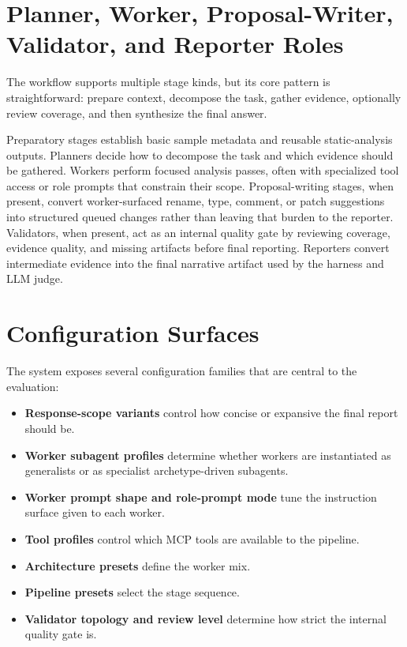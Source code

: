 \section{Planner, Worker, Proposal-Writer, Validator, and Reporter Roles}

The workflow supports multiple stage kinds, but its core pattern is straightforward: prepare context, decompose the task, gather evidence, optionally review coverage, and then synthesize the final answer.

Preparatory stages establish basic sample metadata and reusable static-analysis outputs. Planners decide how to decompose the task and which evidence should be gathered. Workers perform focused analysis passes, often with specialized tool access or role prompts that constrain their scope. Proposal-writing stages, when present, convert worker-surfaced rename, type, comment, or patch suggestions into structured queued changes rather than leaving that burden to the reporter. Validators, when present, act as an internal quality gate by reviewing coverage, evidence quality, and missing artifacts before final reporting. Reporters convert intermediate evidence into the final narrative artifact used by the harness and LLM judge.

\section{Configuration Surfaces}

The system exposes several configuration families that are central to the evaluation:
\begin{itemize}
\item \textbf{Response-scope variants} control how concise or expansive the final report should be.
\item \textbf{Worker subagent profiles} determine whether workers are instantiated as generalists or as specialist archetype-driven subagents.
\item \textbf{Worker prompt shape and role-prompt mode} tune the instruction surface given to each worker.
\item \textbf{Tool profiles} control which MCP tools are available to the pipeline.
\item \textbf{Architecture presets} define the worker mix.
\item \textbf{Pipeline presets} select the stage sequence.
\item \textbf{Validator topology and review level} determine how strict the internal quality gate is.
\end{itemize}

